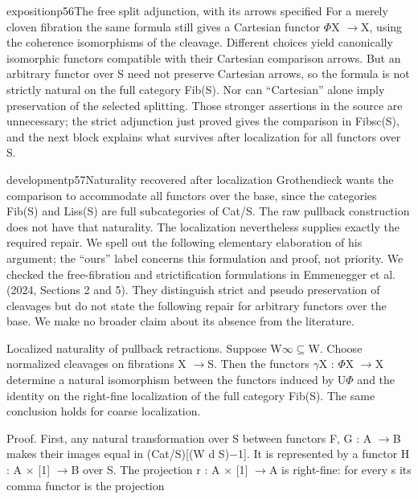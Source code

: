 \begin{dcomment}{exposition}{p56}{The free split adjunction, with its arrows specified}
For a merely cloven fibration the same formula still gives a Cartesian functor \ensuremath{\Phi}X \ensuremath{\to}X, using the coherence isomorphisms of the cleavage. Different choices yield canonically isomorphic functors compatible with their Cartesian comparison arrows. But an arbitrary functor over S need not preserve Cartesian arrows, so the formula is not strictly natural on the full category Fib(S). Nor can “Cartesian” alone imply preservation of the selected splitting. Those stronger assertions in the source are unnecessary; the strict adjunction just proved gives the comparison in Fibsc(S), and the next block explains what survives after localization for all functors over S.

\end{dcomment}

\begin{dcomment}{development}{p57}{Naturality recovered after localization}
Grothendieck wants the comparison to accommodate all functors over the base, since the categories Fib(S) and Liss(S) are full subcategories of Cat/S. The raw pullback construction does not have that naturality. The localization nevertheless supplies exactly the required repair. We spell out the following elementary elaboration of his argument; the “ours” label concerns this formulation and proof, not priority. We checked the free-fibration and strictification formulations in Emmenegger et al. (2024, Sections 2 and 5). They distinguish strict and pseudo preservation of cleavages but do not state the following repair for arbitrary functors over the base. We make no broader claim about its absence from the literature.

Localized naturality of pullback retractions. \ours Suppose W\ensuremath{\infty}\ensuremath{\subseteq}W. Choose normalized cleavages on fibrations X \ensuremath{\to}S. Then the functors \ensuremath{\gamma}X : \ensuremath{\Phi}X \ensuremath{\to}X determine a natural isomorphism between the functors induced by U\ensuremath{\Phi} and the identity on the right-fine localization of the full category Fib(S). The same conclusion holds for coarse localization.

Proof. First, any natural transformation over S between functors F, G : A \ensuremath{\to}B makes their images equal in (Cat/S)[(W d S)\ensuremath{-}1]. It is represented by a functor H : A \ensuremath{\times} [1] \ensuremath{\to}B over S. The projection r : A \ensuremath{\times} [1] \ensuremath{\to}A is right-fine: for every s its comma functor is the projection


\end{dcomment}
